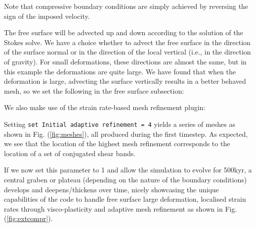 \documentclass{article}
\begin{document}
Note that compressive boundary conditions are simply achieved by reversing  
the sign of the imposed velocity.

The free surface will be advected up and down according to the solution of the Stokes solve.
We have a choice whether to advect the free surface in the direction of the surface normal
or in the direction of the local vertical (i.e., in the direction of gravity).
For small deformations, these directions are almost the same, but in this example the deformations 
are quite large. We have found that when the deformation is large, advecting the surface vertically 
results in a better behaved mesh, so we set the following in the free surface subsection:



We also make use of the strain rate-based mesh refinement plugin:



Setting 
{\tt   set Initial adaptive refinement        = 4}
yields a series of meshes as shown in Fig. (\ref{fig:meshes}), all produced during the 
first timestep. As expected, we see that the location of the highest mesh refinement
corresponds to the location of a set of conjugated shear bands.

If we now set this parameter to 1 and allow the simulation to evolve
for 500kyr, a central graben or plateau (depending on the nature
of the boundary conditions) develops and deepens/thickens over time, nicely showcasing 
the unique capabilities of the code to handle free surface large deformation, localised
strain rates through visco-plasticity and adaptive mesh refinement as
shown in Fig. (\ref{fig:extcompr}).
\end{document}
